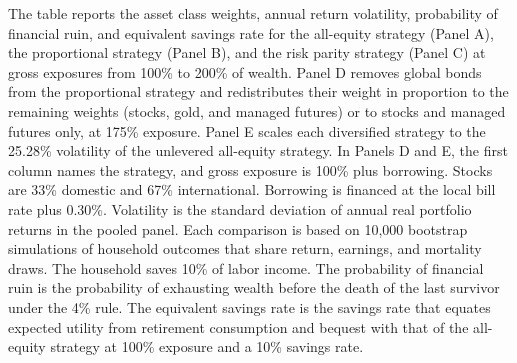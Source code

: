 \begin{table}[p]\centering
\caption{Economic value of levered allocation strategies}\label{tab:central-results}
\begin{minipage}{\linewidth}\small The table reports the asset class weights, annual return volatility, probability of financial ruin, and equivalent savings rate for the all-equity strategy (Panel A), the proportional strategy (Panel B), and the risk parity strategy (Panel C) at gross exposures from 100\% to 200\% of wealth. Panel D removes global bonds from the proportional strategy and redistributes their weight in proportion to the remaining weights (stocks, gold, and managed futures) or to stocks and managed futures only, at 175\% exposure. Panel E scales each diversified strategy to the 25.28\% volatility of the unlevered all-equity strategy. In Panels D and E, the first column names the strategy, and gross exposure is 100\% plus borrowing. Stocks are 33\% domestic and 67\% international. Borrowing is financed at the local bill rate plus 0.30\%. Volatility is the standard deviation of annual real portfolio returns in the pooled panel. Each comparison is based on 10,000 bootstrap simulations of household outcomes that share return, earnings, and mortality draws. The household saves 10\% of labor income. The probability of financial ruin is the probability of exhausting wealth before the death of the last survivor under the 4\% rule. The equivalent savings rate is the savings rate that equates expected utility from retirement consumption and bequest with that of the all-equity strategy at 100\% exposure and a 10\% savings rate.\end{minipage}
\medskip


\end{table}
